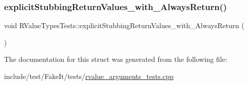 \mbox{\label{structRValueTypesTests_ab6aff1fccc24bdbc7b8e88cddca8f6ce}} 
\subsubsection{\texorpdfstring{explicitStubbingReturnValues\_with\_AlwaysReturn()}{explicitStubbingReturnValues\_with\_AlwaysReturn()}}
{\footnotesize\ttfamily void R\+Value\+Types\+Tests\+::explicit\+Stubbing\+Return\+Values\+\_\+with\+\_\+\+Always\+Return (\begin{DoxyParamCaption}{ }\end{DoxyParamCaption})\hspace{0.3cm}{\ttfamily [inline]}}



The documentation for this struct was generated from the following file\+:\begin{DoxyCompactItemize}
\item 
include/test/\+Fake\+It/tests/\mbox{\hyperlink{rvalue__arguments__tests_8cpp}{rvalue\+\_\+arguments\+\_\+tests.\+cpp}}\end{DoxyCompactItemize}
